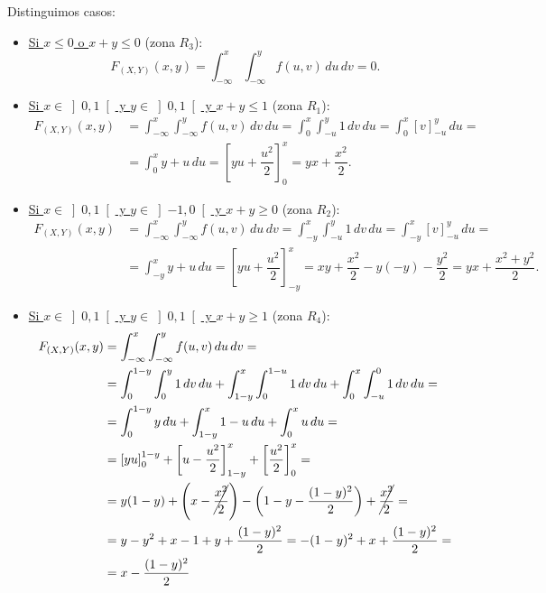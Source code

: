 \begin{ejercicio}
\begin{enumerate}
        Distinguimos casos:
        \begin{itemize}
            \item \ul{Si $x\leq 0$ \quad o \quad $x+y\leq 0$} (zona $R_3$):
            \begin{equation*}
                F_{(X,Y)}(x, y) = \int_{-\infty}^x \int_{-\infty}^y f(u, v) \, du \, dv = 0.
            \end{equation*}

            \item \ul{Si $x\in \left]0,1\right[$ \quad y \quad $y\in \left]0,1\right[$ \quad y \quad $x+y\leq 1$} (zona $R_1$):
            \begin{align*}
                F_{(X,Y)}(x, y) &= \int_{-\infty}^x \int_{-\infty}^y f(u, v) \, dv \, du = \int_{0}^x \int_{-u}^y 1 \, dv \, du = \int_{0}^x \left[v\right]_{-u}^y \, du
                =\\&= \int_{0}^x y+u \, du = \left[yu+\dfrac{u^2}{2}\right]_0^x = yx+\dfrac{x^2}{2}.
            \end{align*}

            \item \ul{Si $x\in \left]0,1\right[$ \quad y \quad $y\in \left]-1,0\right[$ \quad y \quad $x+y\geq 0$} (zona $R_2$):
            \begin{align*}
                F_{(X,Y)}(x, y) &= \int_{-\infty}^x \int_{-\infty}^y f(u, v) \, du \, dv = \int_{-y}^x \int_{-u}^y 1 \, dv \, du = \int_{-y}^x \left[v\right]_{-u}^y \, du
                =\\&= \int_{-y}^x y+u \, du = \left[yu+\dfrac{u^2}{2}\right]_{-y}^x = xy+\dfrac{x^2}{2}-y(-y)-\dfrac{y^2}{2} = yx+\dfrac{x^2+y^2}{2}.
            \end{align*}

            \item \ul{Si $x\in \left]0,1\right[$ \quad y \quad $y\in \left]0,1\right[$ \quad y \quad $x+y\geq 1$} (zona $R_4$):
            \begin{align*}
                F_{(X,Y)}(x, y) &= \int_{-\infty}^x \int_{-\infty}^y f(u, v) \, du \, dv
                =\\&= \int_{0}^{1-y} \int_{0}^y 1 \, dv \, du
                + \int_{1-y}^x \int_{0}^{1-u} 1 \, dv \, du
                + \int_{0}^{x} \int_{-u}^0 1 \, dv \, du
                =\\&= \int_{0}^{1-y} y  \, du
                + \int_{1-y}^x 1-u \, du
                + \int_{0}^{x} u\, du
                =\\&= \left[yu\right]_0^{1-y}
                + \left[u-\dfrac{u^2}{2}\right]_{1-y}^x
                + \left[\dfrac{u^2}{2}\right]_0^x
                =\\&= y(1-y)+\left(x-\cancel{\dfrac{x^2}{2}}\right)-\left(1-y-\dfrac{(1-y)^2}{2}\right)+\cancel{\dfrac{x^2}{2}}
                =\\&= y-y^2+x-1+y+\dfrac{(1-y)^2}{2}
                = -(1-y)^2+x +\dfrac{(1-y)^2}{2}
                =\\&= x -\dfrac{(1-y)^2}{2}
            \end{align*}


\end{itemize}
\end{enumerate}
\end{ejercicio}
